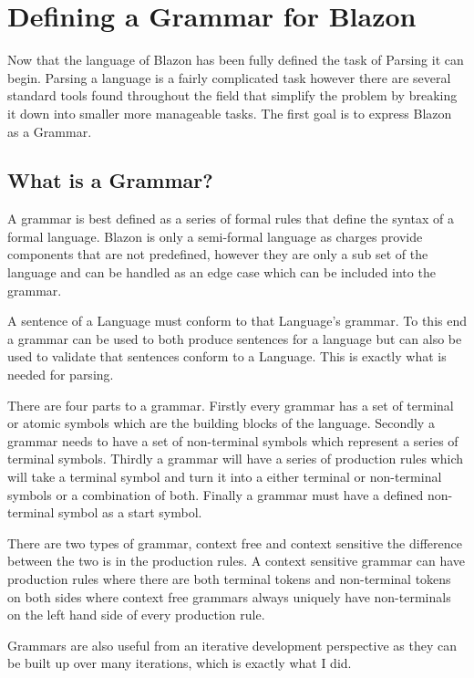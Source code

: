 \chapter{Defining a Grammar for Blazon}

Now that the language of Blazon has been fully defined the task of Parsing it can begin.  Parsing a language is a fairly complicated task however there are several standard tools found throughout the field that simplify the problem by breaking it down into smaller more manageable tasks. The first goal is to express Blazon as a Grammar. 


\section{What is a Grammar?}
A grammar is best defined as a series of formal rules that define the syntax of a formal language.  Blazon is only a semi-formal language as charges provide components that are not predefined, however they are only a sub set of the language and can be handled as an edge case which can be included into the grammar.  

A sentence of a Language must conform to that Language's grammar.  To this end a grammar can be used to both produce sentences for a language but can also be used to validate that sentences conform to a Language. This is exactly what is needed for parsing. 


There are four parts to a grammar.  Firstly every grammar has a set of terminal or atomic symbols which are the building blocks of the language.  Secondly a grammar needs to have a set of non-terminal symbols which represent a series of terminal symbols.  Thirdly a grammar will have a series of production rules which will take a terminal symbol and turn it into a either terminal or non-terminal symbols or a combination of both. Finally a grammar must have a defined non-terminal symbol as a start symbol.



There are two types of grammar, context free and context sensitive the difference between the two is in the production rules.  A context sensitive grammar can have production rules where there are both terminal tokens and non-terminal tokens on both sides where context free grammars always uniquely have non-terminals on the left hand side of every production rule. 

Grammars are also useful from an iterative development perspective as they can be built up over many iterations, which is exactly what I did.  

